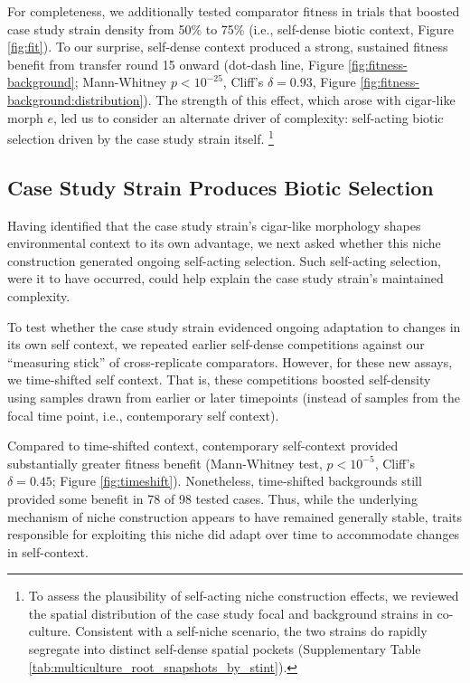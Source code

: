For completeness, we additionally tested comparator fitness in trials that boosted case study strain density from 50\% to 75\% (i.e., self-dense biotic context, Figure \ref{fig:fit}).
To our surprise, self-dense context produced a strong, sustained fitness benefit from transfer round 15 onward (dot-dash line, Figure \ref{fig:fitness-background}; Mann-Whitney $p < 10^{-25}$, Cliff's $\delta=0.93$, Figure \ref{fig:fitness-background:distribution}).
The strength of this effect, which arose with cigar-like morph $e$, led us to consider an alternate driver of complexity: self-acting biotic selection driven by the case study strain itself.
\unskip\footnote{%
To assess the plausibility of self-acting niche construction effects, we reviewed the spatial distribution of the case study focal and background strains in co-culture.
Consistent with a self-niche scenario, the two strains do rapidly segregate into distinct self-dense spatial pockets (Supplementary Table \ref{tab:multiculture_root_snapshots_by_stint}).
}

\subsection{Case Study Strain Produces Biotic Selection}
\label{sec:case-study-strain-produces-biotic-selection}



Having identified that the case study strain's cigar-like morphology shapes environmental context to its own advantage, we next asked whether this niche construction generated ongoing self-acting selection.
Such self-acting selection, were it to have occurred, could help explain the case study strain's maintained complexity.

To test whether the case study strain evidenced ongoing adaptation to changes in its own self context, we repeated earlier self-dense competitions against our ``measuring stick'' of cross-replicate comparators.
However, for these new assays, we time-shifted self context.
That is, these competitions boosted self-density using samples drawn from earlier or later timepoints (instead of samples from the focal time point, i.e., contemporary self context).

Compared to time-shifted context, contemporary self-context provided substantially greater fitness benefit (Mann-Whitney test, $p<10^{-5}$, Cliff's $\delta=0.45$; Figure \ref{fig:timeshift}).
Nonetheless, time-shifted backgrounds still provided some benefit in 78 of 98 tested cases.
Thus, while the underlying mechanism of niche construction appears to have remained generally stable, traits responsible for exploiting this niche did adapt over time to accommodate changes in self-context. %

